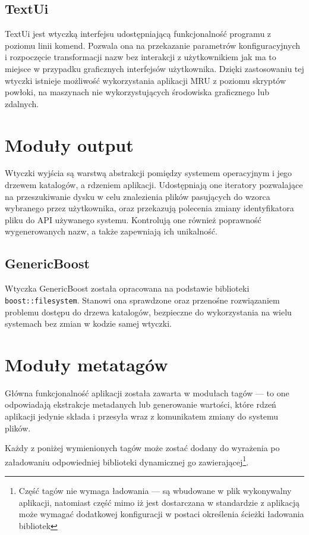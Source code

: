 \subsection{TextUi}
\par
TextUi jest wtyczką interfejsu udostępniającą funkcjonalność programu z poziomu linii komend. Pozwala ona na przekazanie parametrów konfiguracyjnych i rozpoczęcie transformacji nazw bez interakcji z użytkownikiem jak ma to miejsce w przypadku graficznych interfejsów użytkownika. Dzięki zastosowaniu tej wtyczki istnieje możliwość wykorzystania aplikacji MRU z poziomu skryptów powłoki, na maszynach nie wykorzystujących środowiska graficznego lub zdalnych.

\section{Moduły output}
\par
Wtyczki wyjścia są warstwą abstrakcji pomiędzy systemem operacyjnym i jego drzewem katalogów, a rdzeniem aplikacji. Udostępniają one iteratory pozwalające na przeszukiwanie  dysku w celu znalezienia plików pasujących do wzorca wybranego przez użytkownika, oraz przekazują polecenia zmiany identyfikatora pliku do API używanego systemu. Kontrolują one również poprawność wygenerowanych nazw, a także zapewniają ich unikalność.

\subsection{GenericBoost}
Wtyczka GenericBoost została opracowana na podstawie biblioteki \texttt{boost::filesystem}. Stanowi ona sprawdzone oraz przenośne rozwiązaniem problemu dostępu do drzewa katalogów, bezpieczne do wykorzystania na wielu systemach bez zmian w kodzie samej wtyczki.


\section{Moduły metatagów}
Główna funkcjonalność aplikacji została zawarta w modułach tagów --- to one odpowiadają ekstrakcje metadanych lub generowanie wartości, które rdzeń aplikacji jedynie składa i przesyła wraz z komunikatem zmiany do systemu plików.
\par
Każdy z poniżej wymienionych tagów może zostać dodany do wyrażenia po załadowaniu odpowiedniej biblioteki dynamicznej go zawierającej\footnote{Część tagów nie wymaga ładowania --- są wbudowane w plik wykonywalny aplikacji, natomiast część mimo iż jest dostarczana w standardzie z aplikacją może wymagać dodatkowej konfiguracji w postaci określenia ścieżki ładowania bibliotek}.

